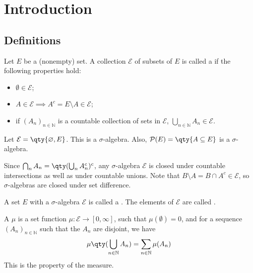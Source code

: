 \section{Introduction}
\subsection{Definitions}

\begin{definition}
	Let $E$ be a (nonempty) set. A collection $\mathcal E$ of subsets of $E$ is called a  if the following properties hold:
	\begin{itemize}
		\item $\emptyset \in \mathcal E$;
		\item $A \in \mathcal E \implies A^c = E \setminus A \in \mathcal E$;
		\item if $(A_n)_{n \in \mathbb N}$ is a countable collection of sets in $\mathcal E$, $\bigcup_{n \in \mathbb N} A_n \in \mathcal E$.
	\end{itemize}
\end{definition}

\begin{example}
	Let $\mathcal E = \qty{\emptyset, E}$.
	This is a $\sigma$-algebra.
	Also, $\mathcal P(E) = \qty{A \subseteq E}$ is a $\sigma$-algebra.
\end{example}

\begin{remark}
	Since $\bigcap_n A_n = \qty(\bigcup_n A_n^c)^c$, any $\sigma$-algebra $\mathcal E$ is closed under countable intersections as well as under countable unions.
	Note that $B \setminus A = B \cap A^c \in \mathcal E$, so $\sigma$-algebras are closed under set difference.
\end{remark}

\begin{definition}
	A set $E$ with a $\sigma$-algebra $\mathcal E$ is called a .
	The elements of $\mathcal E$ are called .
\end{definition}

\begin{definition}[Measure]
	A  $\mu$ is a set function $\mu : \mathcal E \to [0,\infty]$, such that $\mu(\emptyset) = 0$, and for a sequence $(A_n)_{n \in \mathbb N}$ such that the $A_n$ are disjoint, we have
	\[ \mu\qty(\bigcup_{n \in \mathbb N} A_n) = \sum_{n \in \mathbb N} \mu(A_n) \]
	This is the  property of the measure.
\end{definition}

